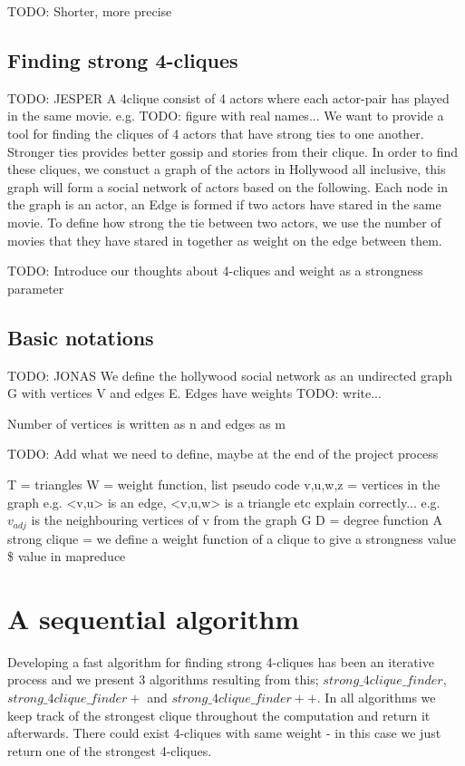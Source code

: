 \documentclass{article}
\begin{document}
TODO: Shorter, more precise


\subsection{Finding strong 4-cliques}
TODO: JESPER
A 4clique consist of 4 actors where each actor-pair has played in the same movie. e.g. TODO: figure with real names...
\noindent We want to provide a tool for finding the cliques of 4 actors that have strong ties to one another. Stronger ties provides better gossip and stories from their clique. In order to find these cliques, we constuct a graph of the actors in Hollywood all inclusive, this graph will form a social network of actors based on the following.
Each node in the graph is an actor, an Edge is formed if two actors have stared in the same movie. To define how strong the tie between two actors, we use the number of movies that they have stared in together as weight on the edge between them.

TODO: Introduce our thoughts about 4-cliques and weight as a strongness parameter

\subsection{Basic notations}
TODO: JONAS
We define the hollywood social network as an undirected graph G with vertices V and edges E.
Edges have weights TODO: write...

Number of vertices is written as n and edges as m

TODO: Add what we need to define, maybe at the end of the project process

T = triangles
W = weight function, list pseudo code
v,u,w,z = vertices in the graph
e.g. <v,u> is an edge, <v,u,w> is a triangle etc explain correctly...
e.g. $v_{adj}$ is the neighbouring vertices of v from the graph G
D = degree function
A strong clique = we define a weight function of a clique to give a strongness value
\$ value in mapreduce


\section{A sequential algorithm}
Developing a fast algorithm for finding strong 4-cliques has been an iterative process and we present 3 algorithms resulting from this; $strong\_4clique\_finder$, $strong\_4clique\_finder+$ and $strong\_4clique\_finder++$. In all algorithms we keep track of the strongest clique throughout the computation and return it afterwards. There could exist 4-cliques with same weight - in this case we just return one of the strongest 4-cliques.
\end{document}
